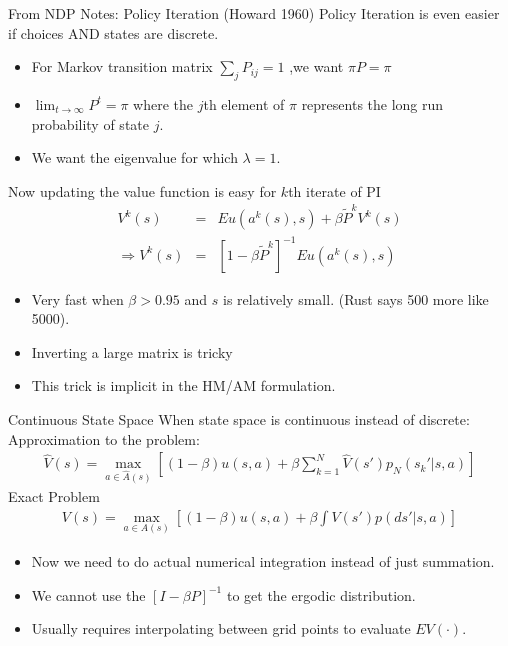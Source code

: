 \documentclass[xcolor=pdftex,dvipsnames,table,mathserif,aspectratio=169]{beamer}
\begin{document}
\begin{frame}{From NDP Notes:  Policy Iteration (Howard 1960)}
Policy Iteration is even easier if choices AND states are discrete.
\begin{itemize}
\item For Markov transition matrix $\sum_j P_{ij} =1$ ,we want $\pi P = \pi$
\item $\lim_{t \rightarrow \infty} P^t = \pi$ where the $j$th element of $\pi$ represents the long run probability of state $j$.
\item We want the eigenvalue for which $\lambda = 1$.
\end{itemize}
Now updating the value function is easy for $k$th iterate of PI
\begin{eqnarray*}
V^k(s) &=& Eu(a^k(s),s) + \beta \tilde{P}^k V^k(s)\\
\Rightarrow V^k(s) &=& [1 - \beta \tilde{P}^k]^{-1} Eu(a^k(s),s)
\end{eqnarray*}
\begin{itemize}
\item Very fast when $\beta > 0.95$ and $s$ is relatively small. (Rust says 500 more like 5000).
\item Inverting a large matrix is tricky
\item \alert{This trick is implicit in the HM/AM formulation}.
\end{itemize}
\end{frame}


\begin{frame}{Continuous State Space}
When state space is continuous instead of discrete:\\
Approximation to the problem:
\begin{eqnarray*}
\hat{V}(s) = \max_{a \in \hat{A}(s)} \left[ (1-\beta) u(s,a) + \beta \sum_{k=1}^N \hat{V}(s')p_N (s_k' | s,a) \right]
\end{eqnarray*}
Exact Problem
\begin{eqnarray*}
V(s) = \max_{a \in A(s)} \left[ (1-\beta) u(s,a) + \beta \int V(s')p(ds' | s,a) \right]
\end{eqnarray*}
\begin{itemize}
\item Now we need to do actual numerical integration instead of just summation.
\item We cannot use the $[I- \beta P]^{-1}$ to get the ergodic distribution.
\item Usually requires interpolating between grid points to evaluate $EV(\cdot)$.
\end{itemize}
\end{frame}
\end{document}
